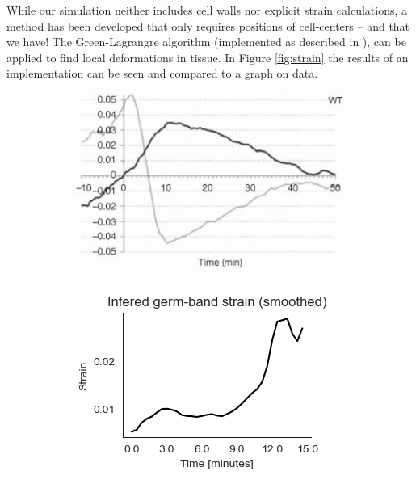 While our simulation neither includes cell walls nor explicit strain calculations, a method has been developed that only requires positions of cell-centers -- and that we have! The Green-Lagrangre algorithm (implemented as described in ), can be applied to find local deformations in tissue. In Figure \ref{fig:strain} the results of an implementation can be seen and compared to a graph on data.
\begin{figure}[H]
    \centering
    \begin{subfigure}{0.5\linewidth}
        \centering
        \includegraphics[width = \linewidth]{chapters/Results/figures/strain_rate_extrinsic2.png}
    \end{subfigure}
        \begin{subfigure}{0.45\linewidth}
        \centering
        \includegraphics[width = \linewidth]{chapters/Results/figures/IntrinsicGermBandStrain.png}

\end{subfigure}
\end{figure}
